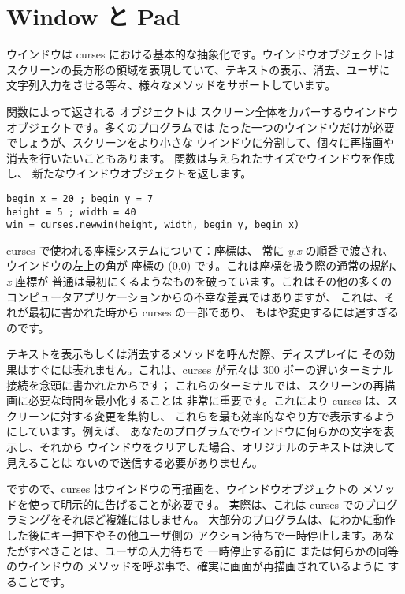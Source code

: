 \documentclass{howto}
\begin{document}
\section{Window と Pad}

ウインドウは curses における基本的な抽象化です。ウインドウオブジェクトは
スクリーンの長方形の領域を表現していて、テキストの表示、消去、ユーザに
文字列入力をさせる等々、様々なメソッドをサポートしています。

 関数によって返される  オブジェクトは
スクリーン全体をカバーするウインドウオブジェクトです。多くのプログラムでは
たった一つのウインドウだけが必要でしょうが、スクリーンをより小さな
ウインドウに分割して、個々に再描画や消去を行いたいこともあります。
 関数は与えられたサイズでウインドウを作成し、
新たなウインドウオブジェクトを返します。

\begin{verbatim}
begin_x = 20 ; begin_y = 7
height = 5 ; width = 40
win = curses.newwin(height, width, begin_y, begin_x)
\end{verbatim}

curses で使われる座標システムについて：座標は、
常に \emph{y.x} の順番で渡され、ウインドウの左上の角が
座標の (0,0) です。これは座標を扱う際の通常の規約、 \emph{x} 座標が
普通は最初にくるようなものを破っています。これはその他の多くの
コンピュータアプリケーションからの不幸な差異ではありますが、
これは、それが最初に書かれた時から curses の一部であり、
もはや変更するには遅すぎるのです。

テキストを表示もしくは消去するメソッドを呼んだ際、ディスプレイに
その効果はすぐには表れません。これは、curses が元々は
300 ボーの遅いターミナル接続を念頭に書かれたからです；
これらのターミナルでは、スクリーンの再描画に必要な時間を最小化することは
非常に重要です。これにより curses は、スクリーンに対する変更を集約し、
これらを最も効率的なやり方で表示するようにしています。例えば、
あなたのプログラムでウインドウに何らかの文字を表示し、それから
ウインドウをクリアした場合、オリジナルのテキストは決して見えることは
ないので送信する必要がありません。

ですので、curses はウインドウの再描画を、ウインドウオブジェクトの 
 メソッドを使って明示的に告げることが必要です。
実際は、これは curses でのプログラミングをそれほど複雑にはしません。
大部分のプログラムは、にわかに動作した後にキー押下やその他ユーザ側の
アクション待ちで一時停止します。あなたがすべきことは、ユーザの入力待ちで
一時停止する前に  または何らかの同等のウインドウの 
 メソッドを呼ぶ事で、確実に画面が再描画されているように
することです。
\end{document}
